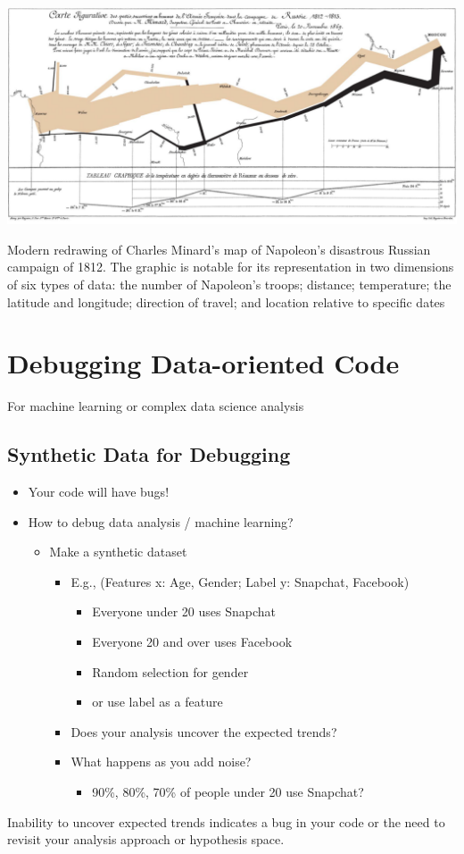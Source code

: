\documentclass[11pt]{article}
\theoremstyle{definition}
\begin{document}
\includegraphics[width=\textwidth]{37.png}

Modern redrawing of Charles Minard's map of Napoleon's disastrous Russian campaign of
1812. The graphic is notable for its representation in two dimensions of six types of data: the
number of Napoleon's troops; distance; temperature; the latitude and longitude; direction of
travel; and location relative to specific dates

\section{Debugging
Data-oriented Code}
For machine learning or complex
data science analysis

\subsection{Synthetic Data for Debugging}
\begin{itemize}
    \item Your code will have bugs!
    \item How to debug data analysis / machine learning?
    \begin{itemize}
        \item Make a synthetic dataset
        \begin{itemize}
            \item E.g., (Features x: Age, Gender; Label y: {Snapchat, Facebook})
            \begin{itemize}
                \item Everyone under 20 uses Snapchat
                \item Everyone 20 and over uses Facebook
                \item Random selection for gender
                \item or use label as a feature
            \end{itemize}
            \item Does your analysis uncover the expected trends?
            \item What happens as you add noise?
            \begin{itemize}
                \item 90\%, 80\%, 70\% of people under 20 use Snapchat?
            \end{itemize}
        \end{itemize}
    \end{itemize}
\end{itemize}

Inability to uncover expected trends indicates a bug in your code
or the need to revisit your analysis approach or hypothesis space.
\end{document}
